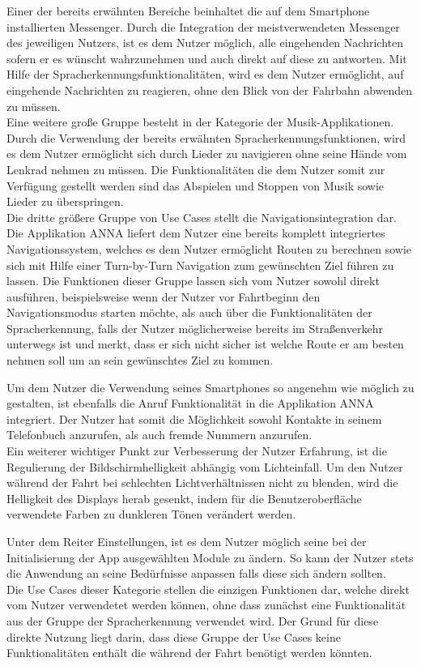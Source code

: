 Einer der bereits erwähnten Bereiche beinhaltet die auf dem Smartphone installierten Messenger. 
Durch die Integration der meistverwendeten Messenger des jeweiligen Nutzers, ist es dem Nutzer möglich, alle eingehenden Nachrichten sofern er es wünscht wahrzunehmen und auch direkt auf diese zu antworten. Mit Hilfe der Spracherkennungsfunktionalitäten, wird es dem Nutzer ermöglicht, auf eingehende Nachrichten zu reagieren, ohne den Blick von der Fahrbahn abwenden zu müssen.\\
Eine weitere große Gruppe besteht in der Kategorie der Musik-Applikationen. Durch die Verwendung der bereits erwähnten Spracherkennungsfunktionen, wird es dem Nutzer ermöglicht sich durch Lieder zu navigieren ohne seine Hände vom Lenkrad nehmen zu müssen. Die Funktionalitäten die dem Nutzer somit zur Verfügung gestellt werden sind das Abspielen und Stoppen von Musik sowie Lieder zu überspringen.\\
Die dritte größere Gruppe von Use Cases stellt die Navigationsintegration dar. Die Applikation \ac{ANNA} liefert dem Nutzer eine bereits komplett integriertes Navigationssystem, welches es dem Nutzer ermöglicht Routen zu berechnen sowie sich mit Hilfe einer Turn-by-Turn Navigation zum gewünschten Ziel führen zu lassen. Die Funktionen dieser Gruppe lassen sich vom Nutzer sowohl direkt ausführen, beispielsweise wenn der Nutzer vor Fahrtbeginn den Navigationsmodus starten möchte, als auch über die Funktionalitäten der Spracherkennung, falls der Nutzer möglicherweise bereits im Straßenverkehr unterwegs ist und merkt, dass er sich nicht sicher ist welche Route er am besten nehmen soll um an sein gewünschtes Ziel zu kommen.

Um dem Nutzer die Verwendung seines Smartphones so angenehm wie möglich zu gestalten, ist ebenfalls die Anruf Funktionalität in die Applikation \ac{ANNA} integriert. Der Nutzer hat somit die Möglichkeit sowohl Kontakte in seinem Telefonbuch anzurufen, als auch fremde Nummern anzurufen.\\
Ein weiterer wichtiger Punkt zur Verbesserung der Nutzer Erfahrung, ist die Regulierung der Bildschirmhelligkeit abhängig vom Lichteinfall. Um den Nutzer während der Fahrt bei schlechten Lichtverhältnissen nicht zu blenden, wird die Helligkeit des Displays herab gesenkt, indem für die Benutzeroberfläche verwendete Farben zu dunkleren Tönen verändert werden.

Unter dem Reiter Einstellungen, ist es dem Nutzer möglich seine bei der Initialisierung der App ausgewählten Module zu ändern. So kann der Nutzer stets die Anwendung an seine Bedürfnisse anpassen falls diese sich ändern sollten.\\
Die Use Cases dieser Kategorie stellen die einzigen Funktionen dar, welche direkt vom Nutzer verwendetet werden können, ohne dass zunächst eine Funktionalität aus der Gruppe der Spracherkennung verwendet wird. Der Grund für diese direkte Nutzung liegt darin, dass diese Gruppe der Use Cases keine Funktionalitäten enthält die während der Fahrt benötigt werden könnten.

